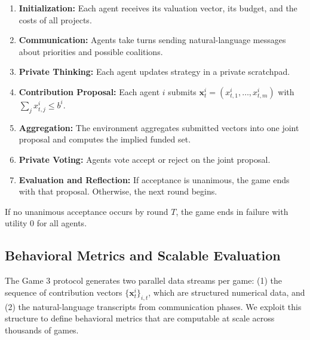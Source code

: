 \begin{enumerate}
    \item \textbf{Initialization:} Each agent receives its valuation vector, its budget, and the costs of all projects.
    \item \textbf{Communication:} Agents take turns sending natural-language messages about priorities and possible coalitions.
    \item \textbf{Private Thinking:} Each agent updates strategy in a private scratchpad.
    \item \textbf{Contribution Proposal:} Each agent $i$ submits $\bm{x}^i_t = (x^i_{t,1}, \ldots, x^i_{t,m})$ with $\sum_j x^i_{t,j} \leq b^i$.
    \item \textbf{Aggregation:} The environment aggregates submitted vectors into one joint proposal and computes the implied funded set.
    \item \textbf{Private Voting:} Agents vote accept or reject on the joint proposal.
    \item \textbf{Evaluation and Reflection:} If acceptance is unanimous, the game ends with that proposal. Otherwise, the next round begins.
\end{enumerate}

If no unanimous acceptance occurs by round $T$, the game ends in failure with utility 0 for all agents.

\subsection{Behavioral Metrics and Scalable Evaluation}
\label{sec:game_3_behavioral_metrics}

The Game 3 protocol generates two parallel data streams per game: (1) the sequence of contribution vectors $\{\bm{x}^i_t\}_{i,t}$, which are structured numerical data, and (2) the natural-language transcripts from communication phases.
We exploit this structure to define behavioral metrics that are computable at scale across thousands of games.

